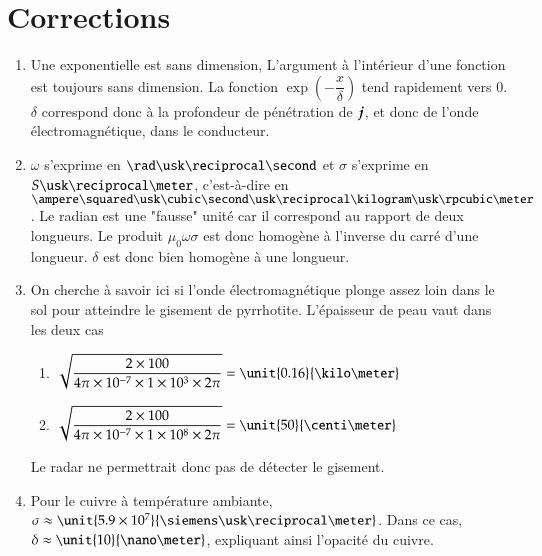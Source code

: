 \section{Corrections}
\begin{corrige}
	\begin{enumerate}
		\item Une exponentielle est sans dimension, 
			L'argument à l'intérieur d'une fonction est toujours sans
			dimension. 
			La fonction $\exp\left(-\dfrac{x}{\delta}\right)$
			tend rapidement vers $0$. $\delta$ correspond donc à la
			profondeur de pénétration de $\vecj$, et donc de 
			l'onde électromagnétique, dans le conducteur.
		\item $\omega$ s'exprime en $\rad \usk \reciprocal \second$ et  
		  $\sigma$ s'exprime en $S \usk \reciprocal \meter$, c'est-à-dire 
		  en $\ampere \squared \usk \cubic \second \usk \reciprocal \kilogram
		  \usk \rpcubic \meter$. Le radian est une "fausse" unité car il
		  correspond au rapport de deux longueurs. Le produit $\mu_0
		  \omega \sigma$ est donc homogène à l'inverse du carré d'une longueur.
		  $\delta$ est donc bien homogène à une longueur.
		\item  On cherche à savoir ici si l'onde électromagnétique
		   plonge assez loin dans le sol pour atteindre le gisement de 
		   pyrrhotite. L'épaisseur de peau vaut dans les deux cas
		   \begin{enumerate}
			   \item $\sqrt{\dfrac{2 \times 100}{4 \pi \times 10^{-7} 
			    \times 1 \times 10^3 \times 2\pi}}
			  = \unit{0.16}{\kilo \meter}$
			\item $\sqrt{\dfrac{2 \times 100}{4 \pi \times 10^{-7} 
			    \times 1 \times 10^8 \times 2\pi}}
			  = \unit{50}{\centi \meter}$
		  \end{enumerate}
		  Le radar ne permettrait donc pas de détecter le gisement.

   	\item Pour le cuivre à température ambiante, $\sigma \approx 
          \unit{5.9 \times 10^7}{\siemens \usk \reciprocal \meter}$. 
	  Dans ce cas, $\delta \approx \unit{10}{\nano \meter}$, expliquant ainsi
	  l'opacité du cuivre.
	\end{enumerate}
\end{corrige}

